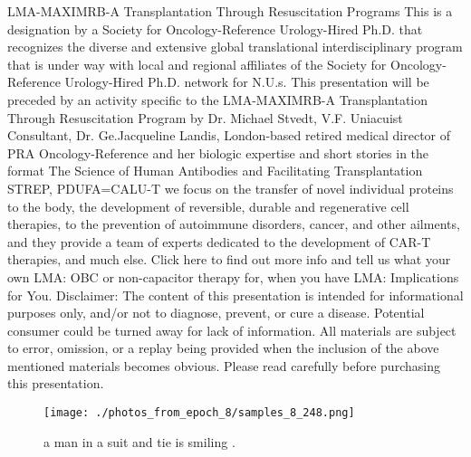 \documentclass{article}%
\begin{document}
LMA{-}MAXIMRB{-}A Transplantation Through Resuscitation Programs\newline%
This is a designation by a Society for Oncology{-}Reference Urology{-}Hired Ph.D. that recognizes the diverse and extensive global translational interdisciplinary program that is under way with local and regional affiliates of the Society for Oncology{-}Reference Urology{-}Hired Ph.D. network for N.U.s.\newline%
This presentation will be preceded by an activity specific to the LMA{-}MAXIMRB{-}A Transplantation Through Resuscitation Program by Dr. Michael Stvedt, V.F. Uniacuist Consultant, Dr. Ge.Jacqueline Landis, London{-}based retired medical director of PRA Oncology{-}Reference and her biologic expertise and short stories in the format The Science of Human Antibodies and Facilitating Transplantation\newline%
STREP, PDUFA=CALU{-}T we focus on the transfer of novel individual proteins to the body, the development of reversible, durable and regenerative cell therapies, to the prevention of autoimmune disorders, cancer, and other ailments, and they provide a team of experts dedicated to the development of CAR{-}T therapies, and much else.\newline%
Click here to find out more info and tell us what your own LMA: OBC or non{-}capacitor therapy for, when you have LMA: Implications for You.\newline%
Disclaimer: The content of this presentation is intended for informational purposes only, and/or not to diagnose, prevent, or cure a disease. Potential consumer could be turned away for lack of information. All materials are subject to error, omission, or a replay being provided when the inclusion of the above mentioned materials becomes obvious. Please read carefully before purchasing this presentation.\newline%

%


\begin{figure}[h!]%
\centering%
\texttt{[image: ./photos\_from\_epoch\_8/samples\_8\_248.png]}%
\caption{a man in a suit and tie is smiling .}%
\end{figure}

%
\end{document}
